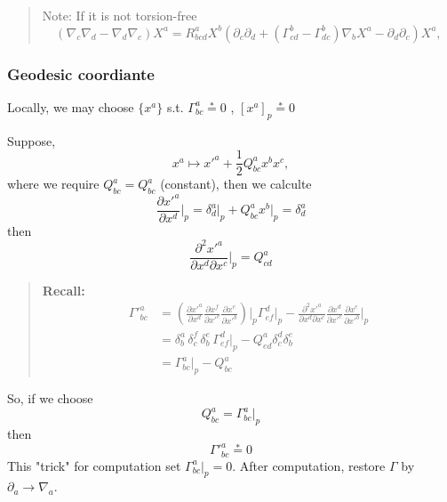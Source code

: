 \begin{quote}
	Note:
If it is not torsion-free
\begin{equation}
\left(\nabla_{c}\nabla_{d} - \nabla_{d}\nabla_{c}\right)X^{a}
=  R^{a}_{bcd} X^{b} \left(\partial_{c}\partial_{d}
+ \left(\Gamma^{b}_{cd}-\Gamma^{b}_{dc}\right)\nabla_{b} X^{a}
- \partial_{d}\partial_{c}\right)X^{a} ,
\end{equation}

\end{quote}
\subsubsection{Geodesic coordiante} %

Locally, we may choose $\{x^{a}\}$ s.t. $\Gamma^{a}_{bc} \stackrel{*}{=} 0$ , $[x^{a}]_{p} \stackrel{*}{=} 0$

Suppose, 
\begin{equation}
x^{a} \mapsto x'^{a} + \frac{1}{2}Q^{a}_{bc} x^{b} x^{c},
\end{equation}
where we require $Q^{a}_{bc} = Q^{a}_{bc}$ (constant), then we calculte
\begin{equation}
\frac{\partial x'^{a}}{\partial x^{d}}\Bigg|_{p} = \delta^{a}_{d} \Bigg|_{p} + Q^{a}_{bc} x^{b}\Bigg|_{p} = \delta^{a}_{d}
\end{equation}
then
\begin{equation}
\frac{\partial^2 x'^{a}}{\partial x^{d}\partial x^{c}}\Bigg|_{p} = Q^{a}_{cd}
\end{equation}


\begin{quote}
	\textbf{Recall:}
\begin{equation}
\begin{aligned}
\Gamma'^{a}_{bc}
&= \left(\frac{\partial x'^{a}}{\partial x^{d}}
\frac{\partial x^{f}}{\partial x'^{c}}
\frac{\partial x^{e}}{\partial x'^{b}}\right)\Bigg|_{p}
\Gamma^{d}_{ef}\Bigg|_{p}
- \frac{\partial^2 x'^{a}}{\partial x^{d}\partial x^{c}}
\frac{\partial x^{d}}{\partial x'^{c}}
\frac{\partial x^{e}}{\partial x'^{b}}\Bigg|_{p}\\
&= \delta^{a}_{b} \, \delta^{f}_{c} \, \delta^{e}_{b} \,\Gamma^{d}_{ef}\Bigg|_{p}
- Q^{a}_{ed}\delta^{d}_{c}\delta^{e}_{b}\\
&= \Gamma^{a}_{bc}\Bigg|_{p} - Q^{a}_{bc}
\end{aligned}
\end{equation}

\end{quote}
So, if we choose 
\begin{equation}
Q^{a}_{bc} = \Gamma^{a}_{bc}\Bigg|_{p}
\end{equation}
then 
\begin{equation}
\Gamma'^{a}_{bc} \stackrel{*}{=} 0
\end{equation}
This "trick" for computation set $\Gamma^{a}_{bc}\Bigg|_{p} = 0$. After computation, restore $\Gamma$ by $\partial_{a}\to \nabla_{a}$.


